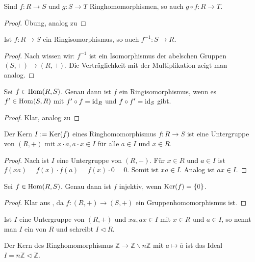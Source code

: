 \begin{proposition}
	Sind $f:R\to S$ und $g:S\to T$ Ringhomomorphismen, so auch $g\circ f:R\to T$.
\end{proposition}
\begin{proof}
	Übung, analog zu 
\end{proof}

\begin{lemma}
	Ist $f:R\to S$ ein Ringisomorphismus, so auch $f^{-1}: S\to R$.
\end{lemma}
\begin{proof}
	Nach  wissen wir: $f^{-1}$ ist ein Isomorphismus der abelschen Gruppen $(S,+)\to (R,+)$. Die Verträglichkeit 
	mit der Multiplikation zeigt man analog.
\end{proof}

\begin{proposition}
	Sei $f\in \operatorname{Hom}(R,S)$. Genau dann ist $f$ ein Ringisomorphismus, wenn es $f'\in \operatorname{Hom}(S,R)$ mit $f'\circ 
	f=\operatorname{id}_R$ und $f\circ f'=\operatorname{id}_S$ gibt.
\end{proposition}
\begin{proof}
	Klar, analog zu 
\end{proof}

\begin{lemma}
	Der Kern $I:=\operatorname{Ker}(f)$ eines Ringhomomorphismus $f:R\to S$ ist eine Untergruppe von $(R,+)$ mit 
	$x\cdot a, a\cdot x \in I$ für alle $a\in I$ und $x\in R$.
\end{lemma}
\begin{proof}
	Nach  ist $I$ eine Untergruppe von $(R,+)$. Für $x\in R$ und $a \in I$ ist $f(xa)=f(x)\cdot 
	f(a)=f(x)\cdot 0=0$. Somit ist $xa\in I$. Analog ist $ax\in I$.
\end{proof}

\begin{proposition}
	Sei $f\in \operatorname{Hom}(R,S)$. Genau dann ist $f$ injektiv, wenn $\operatorname{Ker}(f)=\{0\}$.
\end{proposition}
\begin{proof}
	Klar aus , da $f:(R,+)\to (S,+)$ ein Gruppenhomomorphismus ist.
\end{proof}

\begin{definition}[Ideal]
	Ist $I$ eine Untergruppe von $(R,+)$ und $xa,ax\in I$ mit $x\in R$ und $a\in I$, so nennt 
	man $I$ ein  von $R$ und schreibt $I\vartriangleleft R$.
\end{definition}

\begin{example}
	Der Kern des Ringhomomorphismus $\mathbb Z\to \mathbb Z\backslash n\mathbb Z$ mit $a\mapsto 
	\overline a$ ist das Ideal $I=n\mathbb Z\vartriangleleft \mathbb Z$.
\end{example}